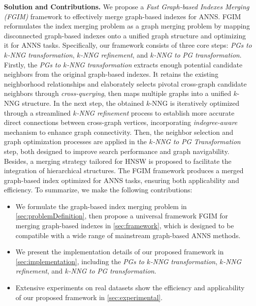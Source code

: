 \documentclass[acmsmall]{acmart}
\theoremstyle{remark}
\theoremstyle{definition}
\begin{document}
\noindent\textbf{Solution and Contributions.} We propose a \textit{Fast Graph-based Indexes Merging (FGIM)} framework to effectively merge graph-based indexes for ANNS. FGIM reformulates the index merging problem as a graph merging problem by mapping disconnected graph-based indexes onto a unified graph structure and optimizing it for ANNS tasks. Specifically, our framework consists of three core steps: \textit{PGs to $k$-NNG transformation}, \textit{$k$-NNG refinement}, and \textit{$k$-NNG to PG transformation}. Firstly, the \textit{PGs to $k$-NNG transformation} extracts enough potential candidate neighbors from the original graph-based indexes. It retains the existing neighborhood relationships and elaborately selects pivotal cross-graph candidate neighbors through \textit{cross-querying}, then maps multiple graphs into a unified $k$-NNG structure. In the next step, the obtained $k$-NNG is iteratively optimized through a streamlined \textit{$k$-NNG refinement} process to establish more accurate direct connections between cross-graph vertices, incorporating \textit{indegree-aware} mechanism to enhance graph connectivity. Then, the neighbor selection and graph optimization processes are applied in the \textit{$k$-NNG to PG Transformation} step, both designed to improve search performance and graph navigability. Besides, a merging strategy tailored for HNSW \cite{malkov2018efficient} is proposed to facilitate the integration of hierarchical structures. The FGIM framework produces a merged graph-based index optimized for ANNS tasks, ensuring both applicability and efficiency. To summarize, we make the following contributions:

\begin{itemize}[leftmargin=*,topsep=0pt, itemsep=0pt, parsep=0pt]
	\item We formulate the graph-based index merging problem in \textsection\ref{sec:problemDefinition}, then propose a universal framework FGIM for merging graph-based indexes in \textsection\ref{sec:framework}, which is designed to be compatible with a wide range of mainstream graph-based ANNS methods.
	\item We present the implementation details of our proposed framework in \textsection\ref{sec:implementation}, including the \textit{PGs to $k$-NNG transformation}, \textit{$k$-NNG refinement}, and \textit{$k$-NNG to PG transformation}. 
	\item Extensive experiments on real datasets show the efficiency and applicability of our proposed framework in \textsection\ref{sec:experimental}.
\end{itemize}
\end{document}
